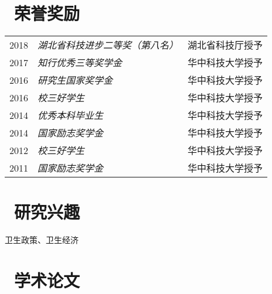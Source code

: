 \documentclass{resume}
\begin{document}
\section{\faSigning\ 荣誉奖励}
\begin{tabular}{rll}
2018 & \textit{湖北省科技进步二等奖（第八名）} & 湖北省科技厅授予 \\
2017 & \textit{知行优秀三等奖学金} & 华中科技大学授予\\
2016 & \textit{研究生国家奖学金} & 华中科技大学授予\\
2016 & \textit{校三好学生} &  华中科技大学授予\\
2014 & 	\textit{优秀本科毕业生} & 华中科技大学授予\\
2014 & 	\textit{国家励志奖学金} &  华中科技大学授予\\
2012 & 	\textit{校三好学生} & 华中科技大学授予\\
2011 & 	\textit{国家励志奖学金} &华中科技大学授予\\
\end{tabular}

\section{\faLeanpub\ 研究兴趣}
卫生政策、卫生经济

\section{\faFileTextO\ 学术论文}
\end{document}
